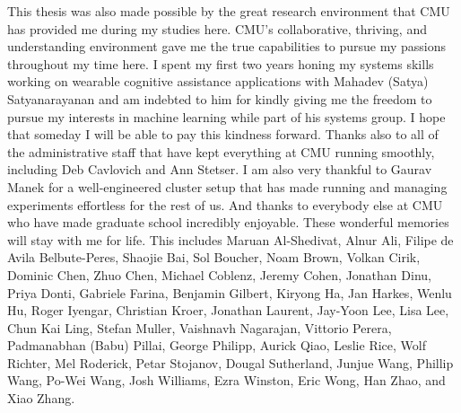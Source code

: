 \begin{acknowledgments}
    This thesis was also made possible by the great research
    environment that CMU has provided me during my studies here.
    CMU's collaborative, thriving, and understanding environment gave
    me the true capabilities to pursue my passions throughout my time here.
    I spent my first two years honing my systems skills working on
    wearable cognitive assistance applications with
    Mahadev (Satya) Satyanarayanan and am
    indebted to him for kindly giving me the freedom to pursue my
    interests in machine learning while part of his systems group.
    I hope that someday I will be able to pay this kindness forward.
    Thanks also to all of the administrative staff that have
    kept everything at CMU running smoothly, including
    Deb Cavlovich and Ann Stetser.
    I am also very thankful to Gaurav Manek for a well-engineered
    cluster setup that has made running and managing
    experiments effortless for the rest of us.
    And thanks to everybody else at CMU who have made
    graduate school incredibly enjoyable.
    These wonderful memories will stay with me for life.
    This includes
    Maruan Al-Shedivat,
    Alnur Ali,
    Filipe de Avila Belbute-Peres,
    Shaojie Bai,
    Sol Boucher,
    Noam Brown,
    Volkan Cirik,
    Dominic Chen,
    Zhuo Chen,
    Michael Coblenz,
    Jeremy Cohen,
    Jonathan Dinu,
    Priya Donti,
    Gabriele Farina,
    Benjamin Gilbert,
    Kiryong Ha,
    Jan Harkes,
    Wenlu Hu,
    Roger Iyengar,
    Christian Kroer,
    Jonathan Laurent,
    Jay-Yoon Lee,
    Lisa Lee,
    Chun Kai Ling,
    Stefan Muller,
    Vaishnavh Nagarajan,
    Vittorio Perera,
    Padmanabhan (Babu) Pillai,
    George Philipp,
    Aurick Qiao,
    Leslie Rice,
    Wolf Richter,
    Mel Roderick,
    Petar Stojanov,
    Dougal Sutherland,
    Junjue Wang,
    Phillip Wang,
    Po-Wei Wang,
    Josh Williams,
    Ezra Winston,
    Eric Wong,
    Han Zhao, and
    Xiao Zhang.


\end{acknowledgments}
